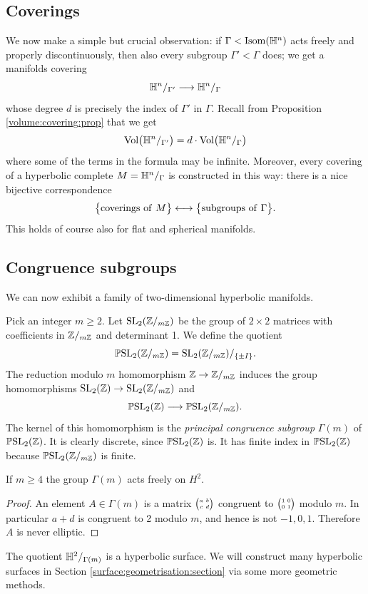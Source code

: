 \subsection{Coverings}
We now make a simple but crucial observation: if $\Gamma < {\rm Isom}(\mathbb{H}^n)$ acts freely and properly discontinuously, then also every subgroup $\Gamma' < \Gamma$ does; we get a manifolds covering
$$\mathbb{H}^n/_{\Gamma'} \longrightarrow \mathbb{H}^n/_\Gamma$$
whose degree $d$ is precisely the index of $\Gamma'$ in $\Gamma$.  Recall from Proposition \ref{volume:covering:prop} that we get
$${\rm Vol}\big(\mathbb{H}^n/_{\Gamma'}\big) = d \cdot {\rm Vol}\big(\mathbb{H}^n/_{\Gamma}\big)$$
where some of the terms in the formula may be infinite. Moreover, every covering of a hyperbolic complete $M= \mathbb{H}^n/_\Gamma$ is constructed in this way: there is a nice bijective correspondence
$$\big\{{\rm coverings\ of\ }M \big\} \longleftrightarrow
\big\{{\rm subgroups\ of\ }\Gamma \big\} .$$
This holds of course also for flat and spherical manifolds.

\subsection{Congruence subgroups}
We can now exhibit a family of two-dimensional hyperbolic manifolds. 

Pick an integer $m\geqslant 2$. Let ${\rm SL}_2(\mathbb{Z}/_{m\mathbb{Z}})$ be the group of $2\times 2$ matrices with coefficients in $\mathbb{Z}/_{m\mathbb{Z}}$ and determinant 1. We define the quotient 
$$\mathbb{P}{\rm SL}_2(\mathbb{Z}/_{m\mathbb{Z}}) = {\rm SL}_2(\mathbb{Z}/_{m\mathbb{Z}})/_{\{ \pm I\}}.$$
The reduction modulo $m$ homomorphism $\mathbb{Z} \to \mathbb{Z}/_{m\mathbb{Z}}$ induces the group homomorphisms ${\rm SL}_2(\mathbb{Z}) \to {\rm SL}_2(\mathbb{Z}/_{m\mathbb{Z}})$ and 
$$\mathbb{P}{\rm SL}_2(\mathbb{Z}) \longrightarrow \mathbb{P}{\rm SL}_2(\mathbb{Z}/_{m\mathbb{Z}}).$$
The kernel of this homomorphism is the \emph{principal congruence subgroup} $\Gamma(m)$ of $\mathbb{P}{\rm SL}_2(\mathbb{Z})$. It is clearly discrete, since $\mathbb{P}{\rm SL}_2(\mathbb{Z})$ is. It has finite index in $\mathbb{P}{\rm SL}_2(\mathbb{Z})$ because $\mathbb{P}{\rm SL}_2(\mathbb{Z}/_{m\mathbb{Z}})$ is finite. 
\begin{prop}
If $m\geqslant 4$ the group $\Gamma(m)$ acts freely on $H^2$.
\end{prop}
\begin{proof}
An element $A\in\Gamma(m)$ is a matrix $\matr abcd$ congruent to $\matr 1001$ modulo $m$. In particular $a+d$ is congruent to 2 modulo $m$, and hence is not $-1, 0, 1$. Therefore $A$ is never elliptic. 
\end{proof}

The quotient $\mathbb{H}^2/_{\Gamma(m)}$ is a hyperbolic surface. We will construct many hyperbolic surfaces in Section \ref{surface:geometrisation:section} via some more geometric methods.

